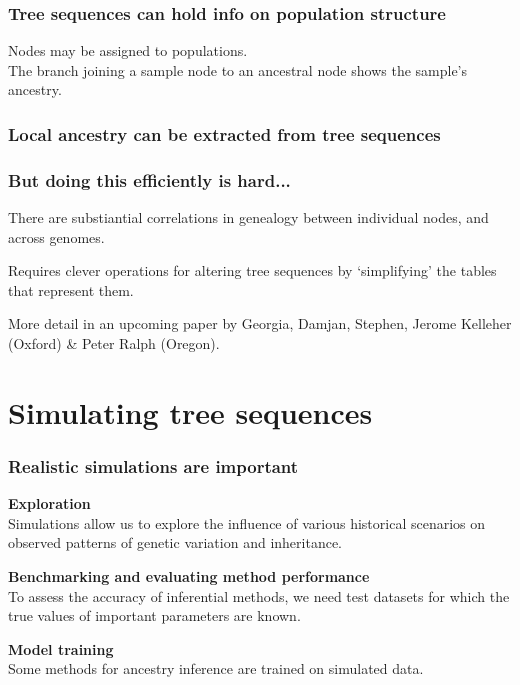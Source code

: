 \documentclass[11pt, mathserif, aspectratio=169]{beamer}
\newenvironment{wideitemize}{\itemize\addtolength{\itemsep}{10pt}}{\enditemize}
\begin{document}
\begin{frame}
\frametitle{Tree sequences can hold info on population structure}
\begin{minipage}{.38\textwidth}
\begin{center}

\end{center}
\end{minipage}\hfill
\begin{minipage}{.58\textwidth}
Nodes may be assigned to populations.\\

The branch joining a sample node to an ancestral node shows the sample's ancestry.

\end{minipage}
\end{frame}

\begin{frame}
\frametitle{Local ancestry can be extracted from tree sequences}
\begin{center}

\end{center}
\end{frame}

\begin{frame}
\frametitle{But doing this efficiently is hard...}
\begin{wideitemize}
\item There are substiantial correlations in genealogy between individual nodes, and across genomes.
\item Requires clever operations for altering tree sequences by `simplifying' the tables that represent them.
\item More detail in an upcoming paper by Georgia, Damjan, Stephen, Jerome Kelleher (Oxford) \& Peter Ralph (Oregon).
\end{wideitemize}
\end{frame}

\section{Simulating tree sequences}

\begin{frame}
\frametitle{Realistic simulations are important}
\begin{wideitemize}
\item {\bf Exploration\\}
Simulations allow us to explore the influence of various historical scenarios on observed patterns of genetic variation and inheritance.
\item {\bf Benchmarking and evaluating method performance\\}
To assess the accuracy of inferential methods, we need test datasets for which the true values of important parameters are known.
\item {\bf Model training\\}
Some methods for ancestry inference are trained on simulated data.
\end{wideitemize}
\end{frame}
\end{document}
